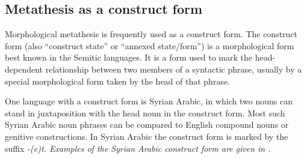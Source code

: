 \subsection{Metathesis as a construct form}\label{sec:ConFor}
Morphological metathesis is frequently used as a construct form.
The construct form (also ``construct state'' or ``annexed state/form'')
is a morphological form best known in the Semitic languages.
It is a form used to mark the head-dependent relationship
between two members of a syntactic phrase,
usually by a special morphological form taken by the head of that phrase.

One language with a construct form is Syrian Arabic,
in which two nouns can stand in juxtaposition
with the head noun in the construct form.
Most such Syrian Arabic noun phrases can be compared
to English compound nouns or genitive constructions.
In Syrian Arabic the construct form is marked by the suffix \it{-(e)t}.
Examples of the Syrian Arabic construct form are given in .

\begin{exe}
	\label{ex:SyrAraConFor}
\end{exe}

